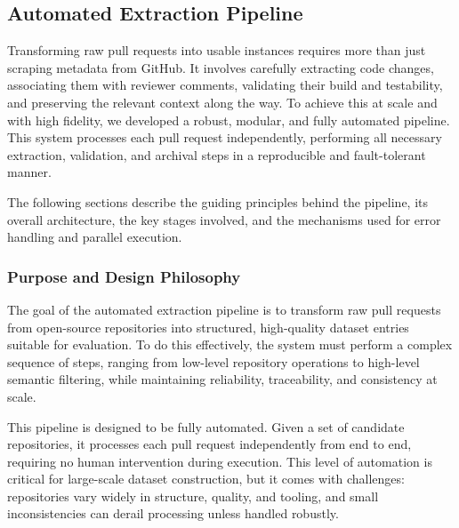 \subsection{Automated Extraction Pipeline}
\label{sec:pipeline}
Transforming raw pull requests into usable instances requires more than just scraping
metadata from GitHub. It involves carefully extracting code changes, associating them with reviewer
comments, validating their build and testability, and preserving the relevant context along the way.
To achieve this at scale and with high fidelity, we developed a robust, modular, and fully automated
pipeline. This system processes each pull request independently, performing all necessary
extraction, validation, and archival steps in a reproducible and fault-tolerant manner.

The following sections describe the guiding principles behind the pipeline, its overall
architecture, the key stages involved, and the mechanisms used for error handling and parallel
execution.

\subsubsection{Purpose and Design Philosophy}

The goal of the automated extraction pipeline is to transform raw pull requests from open-source
repositories into structured, high-quality dataset entries suitable for evaluation. To do this
effectively, the system must perform a complex sequence of steps, ranging from low-level repository
operations to high-level semantic filtering, while maintaining reliability, traceability, and
consistency at scale.

This pipeline is designed to be fully automated. Given a set of candidate repositories, it processes
each pull request independently from end to end, requiring no human intervention during execution.
This level of automation is critical for large-scale dataset construction, but it comes with
challenges: repositories vary widely in structure, quality, and tooling, and small inconsistencies
can derail processing unless handled robustly.

